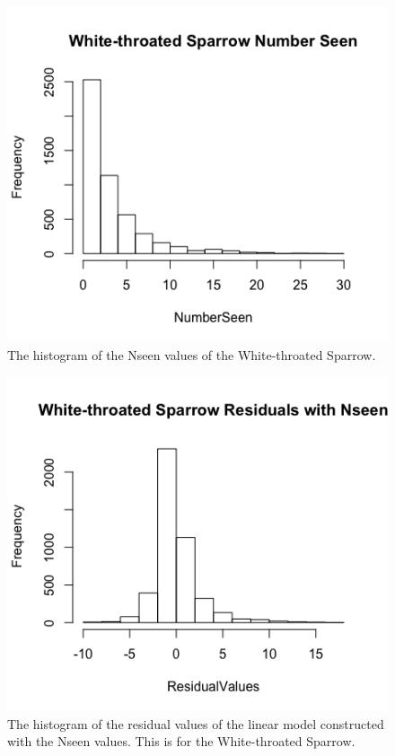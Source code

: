 \begin{figure}[h]
\centering
\includegraphics[width=12cm]{figures/WhiteSparrowNSeen.png}
\caption{The histogram of the Nseen values of the White-throated Sparrow.}
\end{figure}

\begin{figure}[h]
\centering
\includegraphics[width=12cm]{figures/WSResidNolog.png}
\caption{The histogram of the residual values of the linear model constructed with the Nseen values. This is for the White-throated Sparrow.}
\end{figure}


